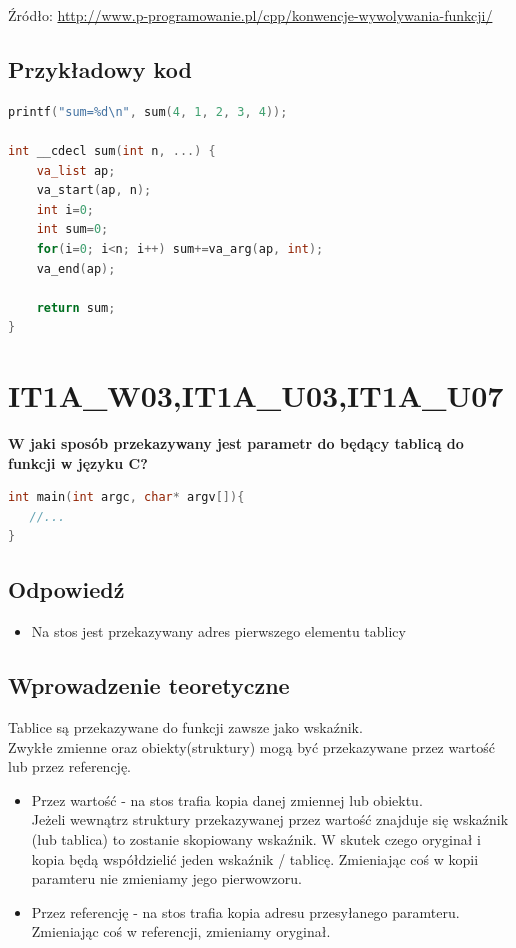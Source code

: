 Źródło: \href{http://www.p-programowanie.pl/cpp/konwencje-wywolywania-funkcji/}{http://www.p-programowanie.pl/cpp/konwencje-wywolywania-funkcji/}

\subsection{Przykładowy kod}

\begin{lstlisting}[language=c]
printf("sum=%d\n", sum(4, 1, 2, 3, 4));

int __cdecl sum(int n, ...) {
	va_list ap;
	va_start(ap, n);
	int i=0;
	int sum=0;
	for(i=0; i<n; i++) sum+=va_arg(ap, int);
	va_end(ap);
	
	return sum;
}
\end{lstlisting}


\section{IT1A\_W03,IT1A\_U03,IT1A\_U07} 
\textbf{W jaki sposób przekazywany jest parametr do będący tablicą do funkcji w języku C?}
\begin{lstlisting}[language=c]
int main(int argc, char* argv[]){
   //...
}
\end{lstlisting}

\subsection{Odpowiedź}
\begin{itemize}
\item Na stos jest przekazywany adres pierwszego elementu tablicy\\
\end{itemize}

\subsection{Wprowadzenie teoretyczne}
Tablice są przekazywane do funkcji zawsze jako wskaźnik.\\
Zwykłe zmienne oraz obiekty(struktury) mogą być przekazywane przez wartość lub przez referencję.
\begin{itemize}
\item Przez wartość - na stos trafia kopia danej zmiennej lub obiektu.\\
Jeżeli wewnątrz struktury przekazywanej przez wartość znajduje się wskaźnik (lub tablica) to zostanie skopiowany wskaźnik. W skutek czego oryginał i kopia będą współdzielić jeden wskaźnik / tablicę. Zmieniając coś w kopii paramteru nie zmieniamy jego pierwowzoru.
\item Przez referencję - na stos trafia kopia adresu przesyłanego paramteru. Zmieniając coś w referencji, zmieniamy oryginał.
\end{itemize}


